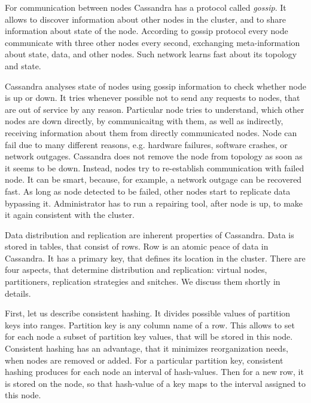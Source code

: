For communication between nodes Cassandra has a protocol called \textit{gossip}.
It allows to discover information about other nodes in the cluster, and to share information about state of the node.
According to gossip protocol every node communicate with three other nodes every second, exchanging meta-information about state, data, and other nodes.
Such network learns fast about its topology and state.

Cassandra analyses state of nodes using gossip information to check whether node is up or down.
It tries whenever possible not to send any requests to nodes, that are out of service by any reason.
Particular node tries to understand, which other nodes are down directly, by communicaitng with them, as well as indirectly, receiving information about them from directly communicated nodes.
Node can fail due to many different reasons, e.g. hardware failures, software crashes, or network outgages.
Cassandra does not remove the node from topology as soon as it seems to be down.
Instead, nodes try to re-establish communication with failed node.
It can be smart, because, for example, a network outgage can be recovered fast.
As long as node detected to be failed, other nodes start to replicate data bypassing it.
Administrator has to run a repairing tool, after node is up, to make it again consistent with the cluster.

Data distribution and replication are inherent properties of Cassandra.
Data is stored in tables, that consist of rows.
Row is an atomic peace of data in Cassandra.
It has a primary key, that defines its location in the cluster.
There are four aspects, that determine distribution and replication: virtual nodes, partitioners, replication strategies and snitches.
We discuss them shortly in details.

First, let us describe consistent hashing.
It divides possible values of partition keys into ranges.
Partition key is any column name of a row.
This allows to set for each node a subset of partition key values, that will be stored in this node.
Consistent hashing has an advantage, that it minimizes reorganization needs, when nodes are removed or added.
For a particular partition key, consistent hashing produces for each node an interval of hash-values.
Then for a new row, it is stored on the node, so that hash-value of a key maps to the interval assigned to this node.


